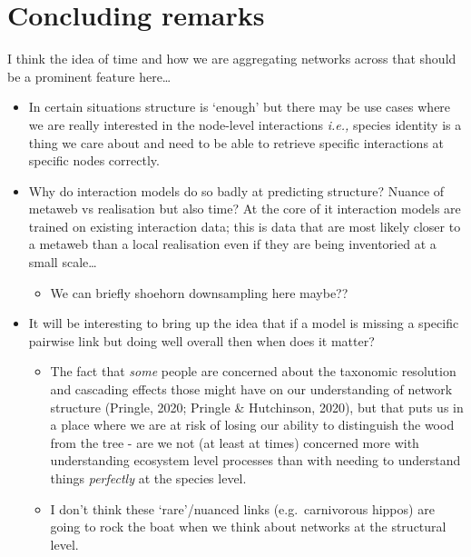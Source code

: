 \documentclass[
]{article}
\providecommand{\tightlist}{%
  \setlength{\itemsep}{0pt}\setlength{\parskip}{0pt}}\usepackage{longtable,booktabs,array}
\begin{document}
\section{Concluding remarks}\label{concluding-remarks}

I think the idea of time and how we are aggregating networks across that
should be a prominent feature here\ldots{}

\begin{itemize}
\item
  In certain situations structure is `enough' but there may be use cases
  where we are really interested in the node-level interactions
  \emph{i.e.,} species identity is a thing we care about and need to be
  able to retrieve specific interactions at specific nodes correctly.
\item
  Why do interaction models do so badly at predicting structure? Nuance
  of metaweb vs realisation but also time? At the core of it interaction
  models are trained on existing interaction data; this is data that are
  most likely closer to a metaweb than a local realisation even if they
  are being inventoried at a small scale\ldots{}

  \begin{itemize}
  \tightlist
  \item
    We can briefly shoehorn downsampling here maybe??
  \end{itemize}
\item
  It will be interesting to bring up the idea that if a model is missing
  a specific pairwise link but doing well overall then when does it
  matter?

  \begin{itemize}
  \item
    The fact that \emph{some} people are concerned about the taxonomic
    resolution and cascading effects those might have on our
    understanding of network structure (Pringle, 2020; Pringle \&
    Hutchinson, 2020), but that puts us in a place where we are at risk
    of losing our ability to distinguish the wood from the tree - are we
    not (at least at times) concerned more with understanding ecosystem
    level processes than with needing to understand things
    \emph{perfectly} at the species level.
  \item
    I don't think these `rare'/nuanced links (e.g.~carnivorous hippos)
    are going to rock the boat when we think about networks at the
    structural level.
  \end{itemize}
\end{itemize}
\end{document}
